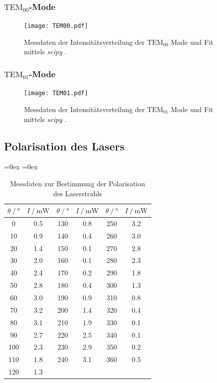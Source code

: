\subsubsection{$\text{TEM}_00$-Mode}

\begin{figure}
  \centering
  \texttt{[image: TEM00.pdf]}
  \caption{Messdaten der Intensitätsverteilung der $\text{TEM}_00$ Mode und Fit mittels \textit{scipy} \cite{scipy}.}
  \label{fig:TEM00}
\end{figure}

\subsubsection{$\text{TEM}_01$-Mode}

\begin{figure}
  \centering
  \texttt{[image: TEM01.pdf]}
  \caption{Messdaten der Intensitätsverteilung der $\text{TEM}_01$ Mode und Fit mittels \textit{scipy} \cite{scipy}.}
  \label{fig:TEM01}
\end{figure}

\subsection{Polarisation des Lasers}

\begin{table}
  \centering
  \aboverulesep=0ex %
  \belowrulesep=0ex %
  \caption{Messdaten zur Bestimmung der Polarisation des Laserstrahls}
  \label{tab:polarisation}
  \begin{tabular}{S[table-format = 3.0] S[table-format = 1.1] | S[table-format = 3.0] S[table-format = 1.1] | S[table-format = 3.0] S[table-format = 1.1]}
    {$\theta \mathbin{/} \unit{\degree}$} & {$I \mathbin{/} \unit{\milli\watt}$} & {$\theta \mathbin{/} \unit{\degree}$} & {$I \mathbin{/} \unit{\milli\watt}$} &%
    {$\theta \mathbin{/} \unit{\degree}$} & {$I \mathbin{/} \unit{\milli\watt}$} \\
    \midrule
    \rule{0pt}{1.1EM}
      0 & 0.5 & 130 & 0.8 & 250 & 3.2 \\
     10 & 0.9 & 140 & 0.4 & 260 & 3.0 \\
     20 & 1.4 & 150 & 0.1 & 270 & 2.8 \\
     30 & 2.0 & 160 & 0.1 & 280 & 2.3 \\
     40 & 2.4 & 170 & 0.2 & 290 & 1.8 \\
     50 & 2.8 & 180 & 0.4 & 300 & 1.3 \\
     60 & 3.0 & 190 & 0.9 & 310 & 0.8 \\
     70 & 3.2 & 200 & 1.4 & 320 & 0.4 \\
     80 & 3.1 & 210 & 1.9 & 330 & 0.1 \\
     90 & 2.7 & 220 & 2.5 & 340 & 0.1 \\
    100 & 2.3 & 230 & 2.9 & 350 & 0.2 \\
    110 & 1.8 & 240 & 3.1 & 360 & 0.5 \\
    120 & 1.3 &     &     &     &     \\
  \end{tabular}
\end{table}


